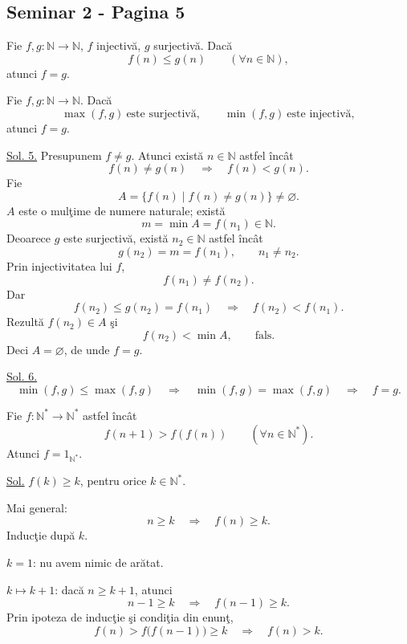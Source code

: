 
\subsection*{Seminar 2 - Pagina 5}

\noindent{}\quad Fie $f,g:\mathbb{N}\longrightarrow\mathbb{N}$,
$f$ injectivă, $g$ surjectivă. Dacă
\[
 f(n)\leq g(n)\qquad (\forall n\in\mathbb{N}),
\]
\noindent atunci $f=g$.

\medskip
\noindent{}\quad Fie $f,g:\mathbb{N}\longrightarrow\mathbb{N}$. Dacă
\[
 \max(f,g)\ \text{este surjectivă},\qquad
 \min(f,g)\ \text{este injectivă},
\]
\noindent atunci $f=g$.

\medskip
\noindent\underline{Sol. 5.} Presupunem $f\neq g$. Atunci există
$n\in\mathbb{N}$ astfel încât
\[
 f(n)\neq g(n)\quad\Longrightarrow\quad f(n)<g(n).
\]
\noindent Fie
\[
 A=\{f(n)\mid f(n)\neq g(n)\}\neq\varnothing.
\]
\noindent $A$ este o mulţime de numere naturale; există
\[
 m=\min A=f(n_1)\in\mathbb{N}.
\]
\noindent Deoarece $g$ este surjectivă, există $n_2\in\mathbb{N}$ astfel încât
\[
 g(n_2)=m=f(n_1),\qquad n_1\neq n_2.
\]
\noindent Prin injectivitatea lui $f$,
\[
 f(n_1)\neq f(n_2).
\]
\noindent Dar
\[
 f(n_2)\leq g(n_2)=f(n_1)
 \quad\Longrightarrow\quad f(n_2)<f(n_1).
\]
\noindent Rezultă $f(n_2)\in A$ şi
\[
 f(n_2)<\min A,\qquad \text{fals}.
\]
\noindent Deci $A=\varnothing$, de unde $f=g$.

\medskip
\noindent\underline{Sol. 6.}
\[
 \min(f,g)\leq\max(f,g)
 \quad\Longrightarrow\quad
 \min(f,g)=\max(f,g)
 \quad\Longrightarrow\quad f=g.
\]

\bigskip
\noindent{}\quad Fie
$f:\mathbb{N}^{*}\longrightarrow\mathbb{N}^{*}$ astfel încât
\[
 f(n+1)>f(f(n))\qquad (\forall n\in\mathbb{N}^{*}).
\]
\noindent Atunci $f=1_{\mathbb{N}^{*}}$.

\medskip
\noindent\underline{Sol.} $f(k)\geq k$, pentru orice
$k\in\mathbb{N}^{*}$.

\noindent Mai general:
\[
 n\geq k\quad\Longrightarrow\quad f(n)\geq k.
\]
\noindent Inducţie după $k$.

\noindent $k=1$: nu avem nimic de arătat.

\noindent $k\longmapsto k+1$: dacă $n\geq k+1$, atunci
\[
 n-1\geq k\quad\Longrightarrow\quad f(n-1)\geq k.
\]
\noindent Prin ipoteza de inducţie şi condiţia din enunţ,
\[
 f(n)>f\bigl(f(n-1)\bigr)\geq k
 \quad\Longrightarrow\quad f(n)>k.
\]
